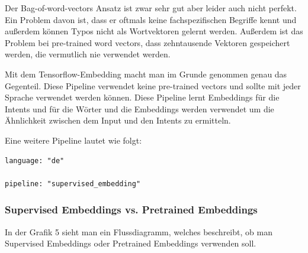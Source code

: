 Der Bag-of-word-vectors Ansatz ist zwar sehr gut aber leider auch nicht perfekt.
Ein Problem davon ist, dass er oftmals keine fachspezifischen Begriffe kennt und außerdem können Typos nicht als Wortvektoren gelernt werden.
Außerdem ist das Problem bei pre-trained word vectors, dass zehntausende Vektoren gespeichert werden, die vermutlich nie verwendet werden.\cite{tensorFlowEmbedding, choosingPipeline}

Mit dem Tensorflow-Embedding macht man im Grunde genommen genau das Gegenteil.
Diese Pipeline verwendet keine pre-trained vectors und sollte mit jeder Sprache verwendet werden können.
Diese Pipeline lernt Embeddings für die Intents und für die Wörter und die Embeddings werden verwendet um die Ähnlichkeit zwischen dem Input und den Intents zu ermitteln.\cite{tensorFlowEmbedding, choosingPipeline}

Eine weitere Pipeline lautet wie folgt:

\begin{lstlisting}[label={lst: Supervised Embedding Pipeline}]
language: "de"

pipeline: "supervised_embedding"
\end{lstlisting}

\subsubsection{Supervised Embeddings vs. Pretrained Embeddings}

In der Grafik 5 sieht man ein Flussdiagramm, welches beschreibt, ob man Supervised Embeddings oder Pretrained Embeddings verwenden soll.

